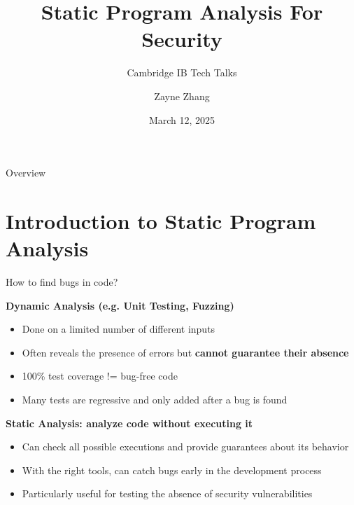 \documentclass[aspectratio=169,xcolor=dvipsnames]{beamer}
\title{Static Program Analysis For Security}
\subtitle{Cambridge IB Tech Talks}
\author{Zayne Zhang}
\institute{zz513@cam.ac.uk}
\date{March 12, 2025}
\begin{document}
\begin{frame}
	\titlepage
\end{frame}

\begin{frame}{Overview}
	\tableofcontents
\end{frame}

\section{Introduction to Static Program Analysis}

\begin{frame}{How to find bugs in code?}

	{\bf Dynamic Analysis (e.g. Unit Testing, Fuzzing)}
	\begin{itemize}
		\item Done on a limited number of different inputs
		\item Often reveals the presence of errors but {\bf cannot guarantee their absence}
		\item 100\% test coverage != bug-free code
		\item Many tests are regressive and only added after a bug is found
	\end{itemize} \bigskip
	{\bf Static Analysis: analyze code without executing it}
	\begin{itemize}
		\item Can check all possible executions and provide guarantees about its behavior
		\item With the right tools, can catch bugs early in the development process
		\item Particularly useful for testing the absence of security vulnerabilities
	\end{itemize}
\end{frame}

\end{document}
